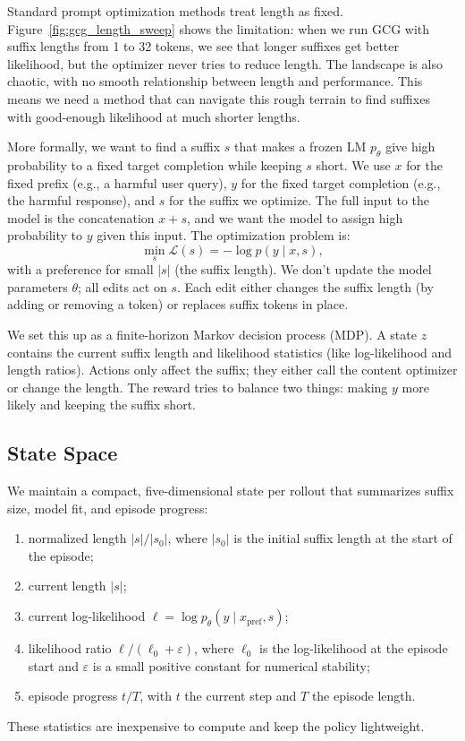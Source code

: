 \documentclass[11pt]{article}
\begin{document}
Standard prompt optimization methods treat length as fixed. Figure~\ref{fig:gcg_length_sweep} shows the limitation: when we run GCG with suffix lengths from 1 to 32 tokens, we see that longer suffixes get better likelihood, but the optimizer never tries to reduce length. The landscape is also chaotic, with no smooth relationship between length and performance. This means we need a method that can navigate this rough terrain to find suffixes with good-enough likelihood at much shorter lengths.

More formally, we want to find a suffix \(s\) that makes a frozen LM \(p_\theta\) give high probability to a fixed target completion while keeping \(s\) short. We use \(x\) for the fixed prefix (e.g., a harmful user query), \(y\) for the fixed target completion (e.g., the harmful response), and \(s\) for the suffix we optimize. The full input to the model is the concatenation \(x + s\), and we want the model to assign high probability to \(y\) given this input. The optimization problem is:
\begin{equation}
  \min_{s} \mathcal{L}(s) = -\log p(y \mid x, s),
\end{equation}
with a preference for small \(|s|\) (the suffix length). We don't update the model parameters \(\theta\); all edits act on \(s\). Each edit either changes the suffix length (by adding or removing a token) or replaces suffix tokens in place.

We set this up as a finite-horizon Markov decision process (MDP). A state \(z\) contains the current suffix length and likelihood statistics (like log-likelihood and length ratios). Actions only affect the suffix; they either call the content optimizer or change the length. The reward tries to balance two things: making \(y\) more likely and keeping the suffix short.

\subsection{State Space}
\label{subsec:state}

We maintain a compact, five-dimensional state per rollout that summarizes suffix size, model fit, and episode progress:
\begin{enumerate}[itemsep=0pt, topsep=2pt]
  \item normalized length \(|s|/|s_0|\), where \(|s_0|\) is the initial suffix length at the start of the episode;
  \item current length \(|s|\);
  \item current log-likelihood \(\ell = \log p_\theta(y \mid x_{\text{pref}}, s)\);
  \item likelihood ratio \(\ell / (\ell_0+\varepsilon)\), where \(\ell_0\) is the log-likelihood at the episode start and \(\varepsilon\) is a small positive constant for numerical stability;
  \item episode progress \(t/T\), with \(t\) the current step and \(T\) the episode length.
\end{enumerate}
These statistics are inexpensive to compute and keep the policy lightweight.
\end{document}
